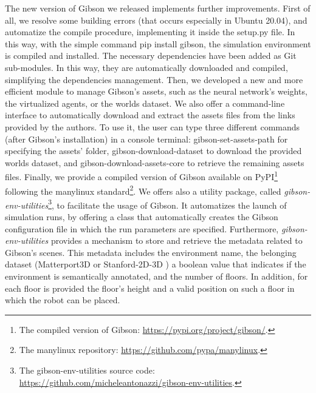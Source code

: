 The new version of Gibson we released implements further improvements. First of all, we resolve some building errors (that occurs especially in Ubuntu 20.04), and automatize the compile procedure, implementing it inside the \textsf{setup.py} file. In this way, with the simple command \textsf{pip install gibson}, the simulation environment is compiled and installed. The necessary dependencies have been added as Git sub-modules. In this way, they are automatically downloaded and compiled, simplifying the dependencies management. Then, we developed a new and more efficient module to manage Gibson's assets, such as the neural network's weights, the virtualized agents, or the worlds dataset. We also offer a command-line interface to automatically download and extract the assets files from the links provided by the authors. To use it, the user can type three different commands (after Gibson's installation) in a console terminal: \textsf{gibson-set-assets-path} for specifying the assets' folder, \textsf{gibson-download-dataset} to download the provided worlds dataset, and \textsf{gibson-download-assets-core} to retrieve the remaining assets files. Finally, we provide a compiled version of Gibson available on PyPI\footnote{The compiled version of Gibson: \url{https://pypi.org/project/gibson/}.} following the manylinux standard\footnote{The manylinux repository: \url{https://github.com/pypa/manylinux}.}. We offers also a utility package, called \textit{gibson-env-utilities}\footnote{The gibson-env-utilities source code: \url{https://github.com/micheleantonazzi/gibson-env-utilities}.}, to facilitate the usage of Gibson. It automatizes the launch of simulation runs, by offering a class that automatically creates the Gibson configuration file in which the run parameters are specified. Furthermore, \textit{gibson-env-utilities} provides a mechanism to store and retrieve the metadata related to Gibson's scenes. This metadata includes the environment name, the belonging dataset (Matterport3D \cite{matterport} or Stanford-2D-3D \cite{stanford2d3d}) a boolean value that indicates if the environment is semantically annotated, and the number of floors. In addition, for each floor is provided the floor's height and a valid position on such a floor in which the robot can be placed.


